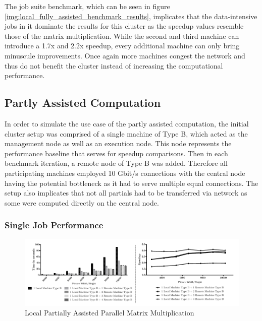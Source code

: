 The job suite benchmark, which can be seen in figure \ref{img:local_fully_assisted_benchmark_results}, implicates that the data-intensive jobs in it dominate the results for this cluster as the speedup values resemble those of the matrix multiplication. While the second and third machine can introduce a 1.7x and 2.2x speedup, every additional machine can only bring minuscule improvements. Once again more machines congest the network and thus do not benefit the cluster instead of increasing the computational performance.

\subsection{Partly Assisted Computation}

In order to simulate the use case of the partly assisted computation, the initial cluster setup was comprised of a single machine of Type B, which acted as the management node as well as an execution node. This node represents the performance baseline that serves for speedup comparisons. Then in each benchmark iteration, a remote node of Type B was added. Therefore all participating machines employed 10 Gbit/s connections with the central node having the potential bottleneck as it had to serve multiple equal connections. The setup also implicates that not all partials had to be transferred via network as some were computed directly on the central node.

\subsubsection*{Single Job Performance}
\label{single_job_performance}

\begin{figure}[!htb]

	\includegraphics[width=1.0\textwidth]{images/local_partially_assisted_matrix.pdf}
	\centering
	\caption{Local Partially Assisted Parallel Matrix Multiplication}
	\label{img:parallel_matrix}
\end{figure}

